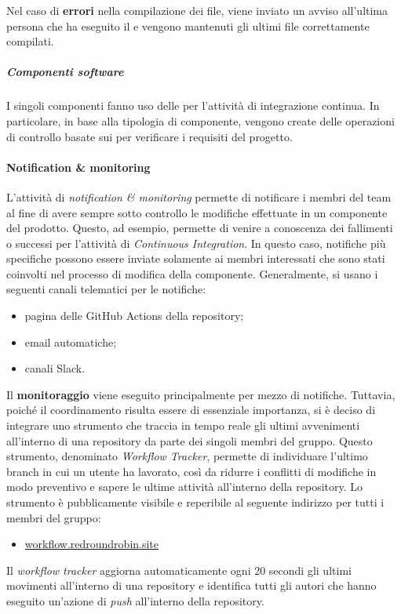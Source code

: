 		Nel caso di \textbf{errori} nella compilazione dei file, viene inviato un avviso all'ultima persona che ha eseguito il  e vengono mantenuti gli ultimi file correttamente compilati.

		\subparagraph{Componenti software}

		I singoli componenti fanno uso delle  per l'attività di integrazione continua. In particolare, in base alla tipologia di componente, vengono create delle operazioni di controllo basate sui  per verificare i requisiti del progetto.
	

	\paragraph{Notification \& monitoring}

	L'attività di \textit{notification \& monitoring} permette di notificare i membri del team al fine di avere sempre sotto controllo le modifiche effettuate in un componente del prodotto. Questo, ad esempio, permette di venire a conoscenza dei fallimenti o successi per l'attività di \textit{Continuous Integration}. In questo caso, notifiche più specifiche possono essere inviate solamente ai membri interessati che sono stati coinvolti nel processo di modifica della componente. 
	\newline
	Generalmente, si usano i seguenti canali telematici per le notifiche:
	\begin{itemize}
		\item pagina delle GitHub Actions della repository;
		\item email automatiche;
		\item canali Slack.
	\end{itemize}

	Il \textbf{monitoraggio} viene eseguito principalmente per mezzo di notifiche. Tuttavia, poiché il coordinamento risulta essere di essenziale importanza, si è deciso di integrare uno strumento che traccia in tempo reale gli ultimi avvenimenti all'interno di una repository da parte dei singoli membri del gruppo.
	Questo strumento, denominato \textit{Workflow Tracker}, permette di individuare l'ultimo branch in cui un utente ha lavorato, così da ridurre i conflitti di modifiche in modo preventivo e sapere le ultime attività all'interno della repository.
	\newline
	Lo strumento è pubblicamente visibile e reperibile al seguente indirizzo per tutti i membri del gruppo:
	\begin{itemize}
		\item \href{https://workflow.redroundrobin.site}{workflow.redroundrobin.site}
	\end{itemize}
	Il \textit{workflow tracker} aggiorna automaticamente ogni 20 secondi gli ultimi movimenti all'interno di una repository e identifica tutti gli autori che hanno eseguito un'azione di \textit{push} all'interno della repository.


